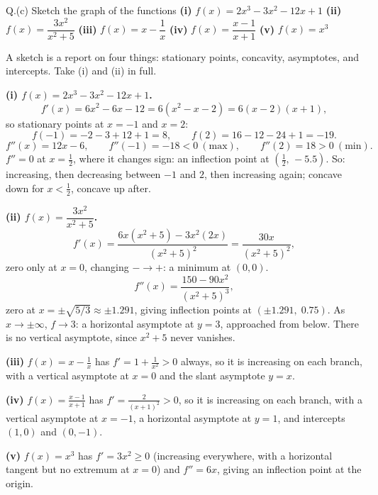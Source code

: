 \begin{question}{Q.(c)}
Sketch the graph of the functions
\textbf{(i)} $f(x)=2x^{3}-3x^{2}-12x+1$ \quad
\textbf{(ii)} $f(x)=\dfrac{3x^{2}}{x^{2}+5}$ \quad
\textbf{(iii)} $f(x)=x-\dfrac1x$ \quad
\textbf{(iv)} $f(x)=\dfrac{x-1}{x+1}$ \quad
\textbf{(v)} $f(x)=x^{3}$
\end{question}

\begin{solution}
A sketch is a report on four things: stationary points, concavity,
asymptotes, and intercepts. Take (i) and (ii) in full.

\medskip
\textbf{(i) $f(x)=2x^{3}-3x^{2}-12x+1$.}
\[
f'(x)=6x^{2}-6x-12=6(x^{2}-x-2)=6(x-2)(x+1),
\]
so stationary points at $x=-1$ and $x=2$:
\[
f(-1)=-2-3+12+1=8,\qquad f(2)=16-12-24+1=-19 .
\]
\[
f''(x)=12x-6,\qquad f''(-1)=-18<0 \ (\text{max}),\qquad f''(2)=18>0 \ (\text{min}).
\]
$f''=0$ at $x=\tfrac12$, where it changes sign: an inflection point at
$\left(\tfrac12,\,-5.5\right)$. So: increasing, then decreasing between $-1$ and
$2$, then increasing again; concave down for $x<\tfrac12$, concave up after.

\medskip
\textbf{(ii) $f(x)=\dfrac{3x^{2}}{x^{2}+5}$.}
\[
f'(x)=\frac{6x(x^{2}+5)-3x^{2}(2x)}{(x^{2}+5)^{2}}=\frac{30x}{(x^{2}+5)^{2}} ,
\]
zero only at $x=0$, changing $-\to+$: a minimum at $(0,0)$.
\[
f''(x)=\frac{150-90x^{2}}{(x^{2}+5)^{3}},
\]
zero at $x=\pm\sqrt{5/3}\approx\pm1.291$, giving inflection points at
$\left(\pm1.291,\;0.75\right)$. As $x\to\pm\infty$, $f\to3$: a horizontal
asymptote at $y=3$, approached from below. There is no vertical asymptote,
since $x^{2}+5$ never vanishes.

\medskip
\textbf{(iii)} $f(x)=x-\tfrac1x$ has $f'=1+\tfrac{1}{x^{2}}>0$ always, so it is
increasing on each branch, with a vertical asymptote at $x=0$ and the slant
asymptote $y=x$.

\textbf{(iv)} $f(x)=\tfrac{x-1}{x+1}$ has $f'=\tfrac{2}{(x+1)^{2}}>0$, so it is
increasing on each branch, with a vertical asymptote at $x=-1$, a horizontal
asymptote at $y=1$, and intercepts $(1,0)$ and $(0,-1)$.

\textbf{(v)} $f(x)=x^{3}$ has $f'=3x^{2}\ge0$ (increasing everywhere, with a
horizontal tangent but no extremum at $x=0$) and $f''=6x$, giving an inflection
point at the origin.


\end{solution}
